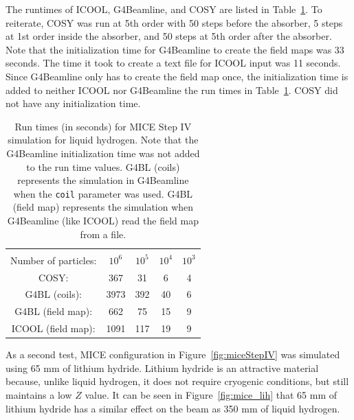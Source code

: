 \documentclass[a4paper,11pt]{article}
\begin{document}
The runtimes of ICOOL, G4Beamline, and COSY are listed in Table~\ref{tbl:mice_times}. To reiterate, COSY was run at 5th order with 50 steps before the absorber, 5 steps at 1st order inside the absorber, and 50 steps at 5th order after the absorber. Note that the initialization time for G4Beamline to create the field maps was 33 seconds. The time it took to create a text file for ICOOL input was 11 seconds. Since G4Beamline only has to create the field map once, the initialization time is added to neither ICOOL nor G4Beamline the run times in Table~\ref{tbl:mice_times}. COSY did not have any initialization time.

\begin{table}
\begin{center}
\caption[Run times for MICE Step IV simulation.]{Run times (in seconds) for MICE Step IV simulation for liquid hydrogen. Note that the G4Beamline initialization time was not added to the run time values. G4BL (coils) represents the simulation in G4Beamline when the \texttt{coil} parameter was used. G4BL (field map) represents the simulation when G4Beamline (like ICOOL) read the field map from a file.}
\begin{tabularx}{0.5\columnwidth}{ccccc}
\hline \hline \vspace*{-10pt} \\
Number of particles: & $10^6$ & $10^5$ & $10^4$ & $10^3$\\
\hline
COSY: & 367 & 31 & 6 & 4\\
G4BL (coils): & 3973 & 392 & 40 & 6\\
G4BL (field map): & 662 & 75 & 15 & 9\\
ICOOL (field map): & 1091 & 117 & 19 & 9\\
\hline
\end{tabularx}
\end{center}
\label{tbl:mice_times}
\end{table}

As a second test, MICE configuration in Figure~\ref{fig:miceStepIV} was simulated using 65 mm of lithium hydride. Lithium hydride is an attractive material because, unlike liquid hydrogen, it does not require cryogenic conditions, but still maintains a low $Z$ value. It can be seen in Figure~\ref{fig:mice_lih} that 65 mm of lithium hydride has a similar effect on the beam as 350 mm of liquid hydrogen.
\end{document}
